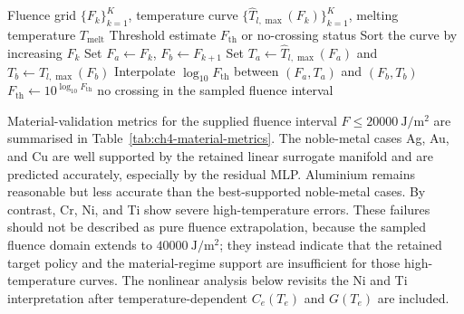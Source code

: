 \begin{algorithm}[htbp]
    \caption{Damage-threshold inversion in logarithmic fluence}
    \label{alg:ch4-threshold-inversion}
    \begin{algorithmic}[1]
        \Require Fluence grid $\{F_k\}_{k=1}^{K}$, temperature curve $\{\hat{T}_{l,\max}(F_k)\}_{k=1}^{K}$, melting temperature $T_{\mathrm{melt}}$
        \Ensure Threshold estimate $F_{\mathrm{th}}$ or no-crossing status
        \State Sort the curve by increasing $F_k$
        \State Set $F_a\gets F_k$, $F_b\gets F_{k+1}$
        \State Set $T_a\gets\hat{T}_{l,\max}(F_a)$ and $T_b\gets\hat{T}_{l,\max}(F_b)$
        \State Interpolate $\log_{10}F_{\mathrm{th}}$ between $(F_a,T_a)$ and $(F_b,T_b)$
        \State \Return $F_{\mathrm{th}}\gets10^{\log_{10}F_{\mathrm{th}}}$
        \EndIf
        \EndFor
        \State \Return no crossing in the sampled fluence interval
    \end{algorithmic}
\end{algorithm}

Material-validation metrics for the supplied fluence interval $F\leq\SI{20000}{\joule\per\metre\squared}$ are summarised in Table~\ref{tab:ch4-material-metrics}. The noble-metal cases Ag, Au, and Cu are well supported by the retained linear surrogate manifold and are predicted accurately, especially by the residual MLP. Aluminium remains reasonable but less accurate than the best-supported noble-metal cases. By contrast, Cr, Ni, and Ti show severe high-temperature errors. These failures should not be described as pure fluence extrapolation, because the sampled fluence domain extends to $\SI{40000}{\joule\per\metre\squared}$; they instead indicate that the retained target policy and the material-regime support are insufficient for those high-temperature curves. The nonlinear analysis below revisits the Ni and Ti interpretation after temperature-dependent \(C_e(T_e)\) and \(G(T_e)\) are included.

